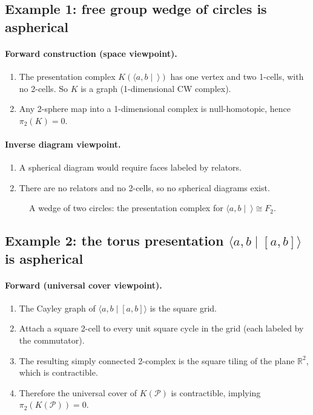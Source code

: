 \documentclass[11pt]{article}
\theoremstyle{definition}
\theoremstyle{plain}
\theoremstyle{remark}
\begin{document}
\subsection*{Example 1: free group wedge of circles is aspherical}
\paragraph{Forward construction (space viewpoint).}
\begin{enumerate}[leftmargin=2.2em]
\item The presentation complex $K(\langle a,b\mid\ \rangle)$ has one vertex and two 1-cells, with no 2-cells.
So $K$ is a graph (1-dimensional CW complex).
\item Any 2-sphere map into a 1-dimensional complex is null-homotopic, hence $\pi_2(K)=0$.
\end{enumerate}

\paragraph{Inverse diagram viewpoint.}
\begin{enumerate}[leftmargin=2.2em]
\item A spherical diagram would require faces labeled by relators.
\item There are no relators and no 2-cells, so no spherical diagrams exist.
\end{enumerate}

\begin{figure}[h]
\centering
{}
\caption{A wedge of two circles: the presentation complex for $\langle a,b\mid\ \rangle\cong F_2$.}
\end{figure}

\subsection*{Example 2: the torus presentation $\langle a,b\mid [a,b]\rangle$ is aspherical}
\paragraph{Forward (universal cover viewpoint).}
\begin{enumerate}[leftmargin=2.2em]
\item The Cayley graph of $\langle a,b\mid [a,b]\rangle$ is the square grid.
\item Attach a square 2-cell to every unit square cycle in the grid (each labeled by the commutator).
\item The resulting simply connected 2-complex is the square tiling of the plane $\mathbb R^2$, which is contractible.
\item Therefore the universal cover of $K(\mathcal P)$ is contractible, implying $\pi_2(K(\mathcal P))=0$.
\end{enumerate}
\end{document}
